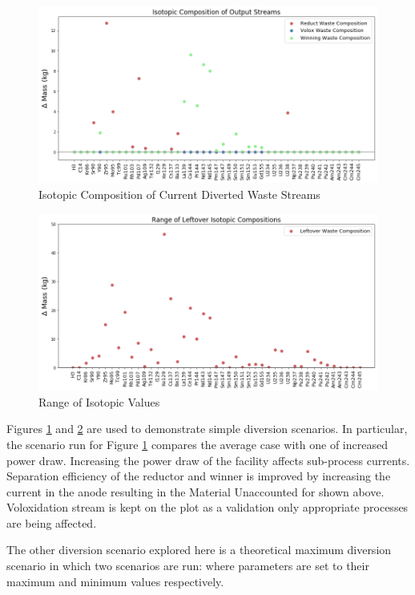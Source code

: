 \begin{figure}
	\centering
	\includegraphics[width=\linewidth]{images/current-isotope-comp}
	\caption{Isotopic Composition of Current Diverted Waste Streams}
	\label{fig:current-isotope-comp}
\end{figure}

\begin{figure}
	\centering
	\includegraphics[width=\linewidth]{images/isotopic-comp-range}
	\caption{Range of Isotopic Values}
	\label{fig:isotopic-range}
\end{figure}

Figures \ref{fig:current-isotope-comp} and \ref{fig:isotopic-range} are used to demonstrate simple diversion scenarios. In particular, the scenario run for Figure
\ref{fig:current-isotope-comp} compares the average case with one of increased power draw. Increasing the power draw of the facility affects sub-process currents.
Separation efficiency of the reductor and winner is improved by increasing the current in the anode resulting in the Material Unaccounted for shown above. Voloxidation stream
is kept on the plot as a validation only appropriate processes are being affected. 

The other diversion scenario explored here is a theoretical maximum diversion scenario in which two scenarios are run: where parameters are set to their maximum and minimum values
respectively. 

